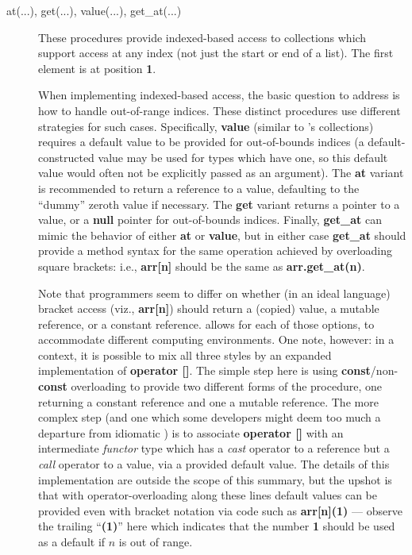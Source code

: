 \documentclass[12pt,letterpaper]{article}
\newcommand{\procitem}[1]{{#1}}
\newcommand{\dprocitem}[1]{{\color{black!60}\textbf{#1}}}
\newcommand{\lHGDM}{\resizebox{!}{8.5pt}{\ATexttclr{H}}%
\resizebox{!}{7.5pt}{\ATexttclr{GDM}}}
\newcommand{\ATexttclr}[1]{\textcolor{tcolor}{\textbf{#1}}}
\newcommand{\textscc}[1]{{\color{orr!35!black}{{%
{\textsc{\textbf{#1}}}}}}}
\newcommand{\AcronymText}[1]{{\textscc{#1}}}
\newcommand{\Cpp}{\resizebox{!}{8pt}{\AcronymText{C++}}}
\newcommand{\Qt}{\resizebox{!}{8pt}{\AcronymText{Qt}}}
\newcommand{\q}[1]{{\fontfamily{qcr}\selectfont ``}#1{\fontfamily{qcr}\selectfont ''}}
\begin{document}
{{\begin{description}

\item[\procitem{at(...)}, 
\procitem{get(...)}, \procitem{value(...)}, 
\procitem{get\_at(...)}]  These procedures provide 
indexed-based access to collections which support 
access at any index (not just the start or end of a 
list).  The first element is at position \textbf{1}.  

\descindent{}  When implementing indexed-based access, 
the basic question to address is how to handle 
out-of-range indices.  These distinct procedures use 
different strategies for such cases.  Specifically, 
\dprocitem{value} (similar to \Qt{}'s collections) 
requires a default value to be provided for out-of-bounds
indices (a default-constructed value may be used for types 
which have one, so this default value would often not 
be explicitly passed as an argument).  The 
\dprocitem{at} variant is recommended to return a reference 
to a value, defaulting to the \q{dummy} zeroth value if 
necessary.  The \dprocitem{get} variant returns a pointer 
to a value, or a \textbf{null} pointer for out-of-bounds 
indices.  Finally, \dprocitem{get\_at} can mimic the 
behavior of either \dprocitem{at} or \dprocitem{value}, 
but in either case \dprocitem{get\_at} should provide a 
method syntax for the same operation achieved by 
overloading square brackets: i.e., \textbf{arr[n]} 
should be the same as \textbf{arr.get\_at(n)}.

\descindent{}  Note that programmers seem to differ 
on whether (in an ideal language) bracket access 
(viz., \textbf{arr[n]}) should return a (copied) value, 
a mutable reference, or a constant reference.  \lHGDM{} 
allows for each of those options, to accommodate 
different computing environments.  One note, however: 
in a \Cpp{} context, it is possible to mix all three 
styles by an expanded implementation of 
\textbf{operator []}.  The simple step here is using 
\textbf{const}/non-\textbf{const} overloading to 
provide two different forms of the procedure, one 
returning a constant reference and one a mutable reference. 
The more complex step (and one which some developers might 
deem too much a departure from idiomatic \Cpp{}) is 
to associate \textbf{operator []} with an intermediate 
\textit{functor} type which has a \textit{cast} operator 
to a reference but a \textit{call} operator to a value, 
via a provided default value.  The details of this 
implementation are outside the scope of this summary, 
but the upshot is that with operator-overloading along 
these lines default values can be provided 
even with bracket notation via code such as 
\textbf{arr[n](1)} --- observe the trailing \q{\textbf{(1)}} 
here which indicates that the number \textbf{1} should 
be used as a default if $n$ is out of range.


\end{description}}}
\end{document}
